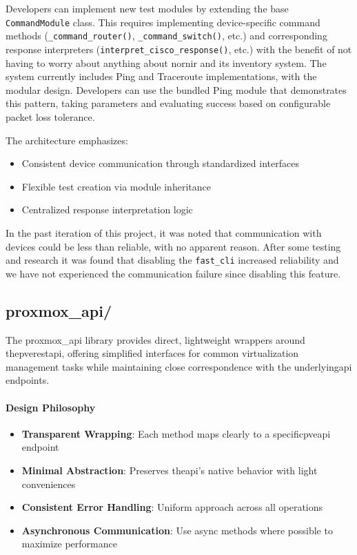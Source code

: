         Developers can implement new test modules by extending the base \texttt{CommandModule} class. This requires 
        implementing device-specific command methods (\texttt{\_command\_router()}, \texttt{\_command\_switch()}, etc.) 
        and corresponding response interpreters (\texttt{interpret\_cisco\_response()}, etc.) with the benefit of not 
        having to worry about anything about nornir and its inventory system. The system currently includes Ping and 
        Traceroute implementations, with the modular design. Developers can use the bundled Ping module that 
        demonstrates this pattern, taking parameters and evaluating success based on configurable packet loss 
        tolerance.

        The architecture emphasizes:
        \begin{itemize}
            \item Consistent device communication through standardized interfaces
            \item Flexible test creation via module inheritance
            \item Centralized response interpretation logic
        \end{itemize}

        In the past iteration of this project, it was noted that communication with devices could be less than reliable,
        with no apparent reason. After some testing and research it was found that disabling the \texttt{fast\_cli} 
        increased reliability and we have not experienced the communication failure since disabling this feature. 
    
    \subsection{proxmox\_api/}

        The proxmox\_api library provides direct, lightweight wrappers around the\ac{pve}\ac{rest}\ac{api}, 
        offering simplified interfaces for common virtualization management tasks while maintaining close 
        correspondence with the underlying\ac{api} endpoints.

        \paragraph{Design Philosophy}
        \begin{itemize}
            \item \textbf{Transparent Wrapping}: Each method maps clearly to a specific\ac{pve}\ac{api} endpoint
            \item \textbf{Minimal Abstraction}: Preserves the\ac{api}'s native behavior with light conveniences
            \item \textbf{Consistent Error Handling}: Uniform approach across all operations
            \item \textbf{Asynchronous Communication}: Use async methods where possible to maximize performance
        \end{itemize}

